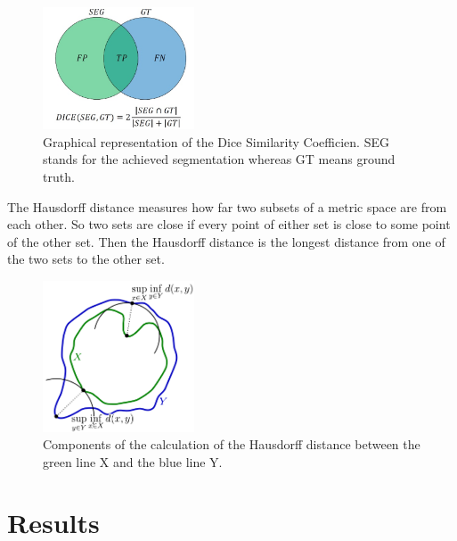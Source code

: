\documentclass[conference]{IEEEtran}
\begin{document}
	\begin{figure}[h]
		\centering
		\includegraphics[width=0.4\textwidth]{diceGraphics.png}
		\caption{Graphical representation of the Dice Similarity Coefficien. SEG stands for the achieved segmentation whereas GT means ground truth.}
		\label{fig:e8}
	\end{figure}

	The Hausdorff distance measures how far two subsets of a metric space are from each other. So two sets are close if every point of either set is close 
	to some point of the other set. Then the Hausdorff distance is the longest distance from one of the two sets to the other set.
	\begin{figure}[h]
		\centering
		\includegraphics[width=0.4\textwidth]{haussdorfGraphics.png}
		\caption{Components of the calculation of the Hausdorff distance between the green line X and the blue line Y.}
		\label{fig:e8}
	\end{figure}



\section{Results}
\end{document}
